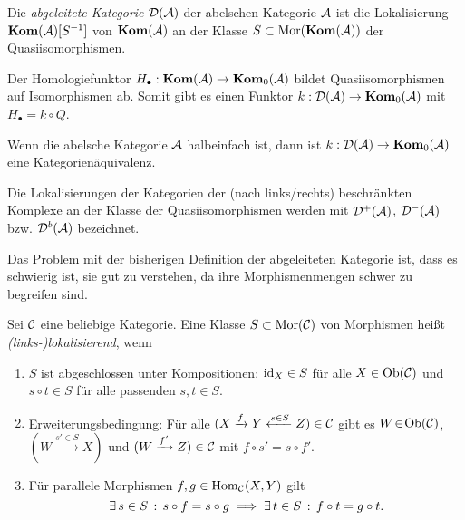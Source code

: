 \documentclass{cheat-sheet}
\begin{document}
\begin{defn}
  Die \emph{abgeleitete Kategorie} $\mathcal{D}(\mathcal{A})$ der abelschen Kategorie $\mathcal{A}$ ist die Lokalisierung $\mathbf{Kom}(\mathcal{A})[S^{-1}]$ von $\mathbf{Kom}(\mathcal{A})$ an der Klasse $S \subset \operatorname{Mor}(\mathbf{Kom}(\mathcal{A}))$ der Quasiisomorphismen.
\end{defn}

\begin{bem}
  Der Homologiefunktor $H_\bullet : \mathbf{Kom}(\mathcal{A}) \to \mathbf{Kom}_0(\mathcal{A})$ bildet Quasiisomorphismen auf Isomorphismen ab. Somit gibt es einen Funktor $k : \mathcal{D}(\mathcal{A}) \to \mathbf{Kom}_0(\mathcal{A})$ mit $H_\bullet = k \circ Q$.
\end{bem}

\begin{prop}
  Wenn die abelsche Kategorie $\mathcal{A}$ halbeinfach ist, dann ist $k : \mathcal{D}(\mathcal{A}) \to \mathbf{Kom}_0(\mathcal{A})$ eine Kategorienäquivalenz.
\end{prop}

\begin{defn}
  Die Lokalisierungen der Kategorien der (nach links/rechts) beschränkten Komplexe an der Klasse der Quasiisomorphismen werden mit $\mathcal{D}^+(\mathcal{A})$, $\mathcal{D}^-(\mathcal{A})$ bzw. $\mathcal{D}^b(\mathcal{A})$ bezeichnet.
\end{defn}

\begin{bem}
  Das Problem mit der bisherigen Definition der abgeleiteten Kategorie ist, dass es schwierig ist, sie gut zu verstehen, da ihre Morphismenmengen schwer zu begreifen sind.
\end{bem}

\begin{defn}
  Sei $\mathcal{C}$ eine beliebige Kategorie.
  Eine Klasse $S \subset \operatorname{Mor}(\mathcal{C})$ von Morphismen heißt \emph{(links-)lokalisierend}, wenn
  \begin{enumerate}
    \item $S$ ist abgeschlossen unter Kompositionen: $\operatorname{id}_X \in S$ für alle $X \in \operatorname{Ob}(\mathcal{C})$ und $s \circ t \in S$ für alle passenden $s, t \in S$.
    \item Erweiterungsbedingung: Für alle $(X \xrightarrow{f} Y \xleftarrow{s \in S} Z) \in \mathcal{C}$ gibt es $W \!\in\! \operatorname{Ob}(\mathcal{C})$, $(W \xrightarrow{s' \in S} X)$ und $(W \xrightarrow{f'} Z) \in \mathcal{C}$ mit $f \circ s' \!=\! s \circ f'$.
    \item Für parallele Morphismen $f, g \in \operatorname{Hom}_{\mathcal{C}}(X, Y)$ gilt
    \[ \exists \, {s \in S} \,:\, s \circ f = s \circ g \implies \exists \, {t \in S} \,:\, f \circ t = g \circ t. \]
  \end{enumerate}
\end{defn}
\end{document}

